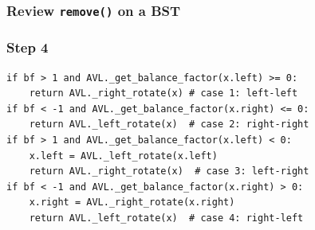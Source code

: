 \documentclass[aspectratio=169, 14pt]{beamer}
\begin{document}
\begin{frame}
    \frametitle{Review \texttt{remove()} on a BST}
\end{frame}

\begin{frame}[fragile]
    \frametitle{Step 4}
    \begin{verbatim}
if bf > 1 and AVL._get_balance_factor(x.left) >= 0:
    return AVL._right_rotate(x) # case 1: left-left
if bf < -1 and AVL._get_balance_factor(x.right) <= 0:
    return AVL._left_rotate(x)  # case 2: right-right
if bf > 1 and AVL._get_balance_factor(x.left) < 0:
    x.left = AVL._left_rotate(x.left)
    return AVL._right_rotate(x)  # case 3: left-right
if bf < -1 and AVL._get_balance_factor(x.right) > 0:
    x.right = AVL._right_rotate(x.right)
    return AVL._left_rotate(x)  # case 4: right-left
    \end{verbatim}

\end{frame}


\end{document}

